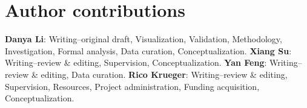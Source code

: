 \documentclass[letterpaper, 10pt, journal]{IEEEtran}  %
\begin{document}
\section*{Author contributions}

\noindent
\textbf{Danya Li}: Writing--original draft, Visualization, Validation, Methodology, Investigation, Formal analysis, Data curation, Conceptualization. 
\textbf{Xiang Su}: Writing--review \& editing, Supervision, Conceptualization. 
\textbf{Yan Feng}: Writing--review \& editing, Data curation. 
\textbf{Rico Krueger}: Writing--review \& editing, Supervision, Resources, Project administration, Funding acquisition, Conceptualization.























\end{document}
